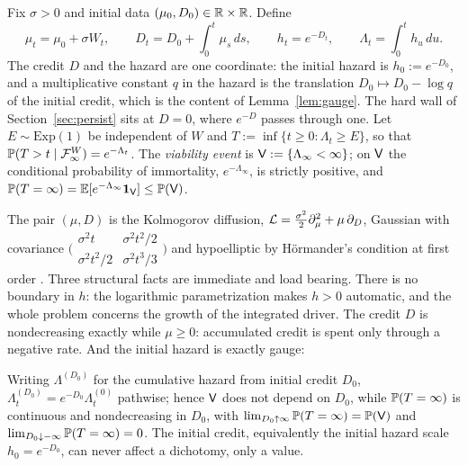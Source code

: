 \begin{definition}\label{def:model}
Fix $\sigma>0$ and initial data $(\mu_0,D_0)\in\mathbb{R}\times\mathbb{R}$. Define
\begin{equation}\label{eq:model}
\mu_t=\mu_0+\sigma W_t,\qquad
D_t=D_0+\int_0^t\mu_s\,ds,\qquad
h_t=e^{-D_t},\qquad
\Lambda_t=\int_0^t h_u\,du .
\end{equation}
The credit $D$ and the hazard are one coordinate: the initial hazard
is $h_0:=e^{-D_0}$, and a multiplicative constant $q$ in the hazard
is the translation $D_0\mapsto D_0-\log q$ of the initial credit,
which is the content of Lemma~\ref{lem:gauge}. The hard wall of
Section~\ref{sec:persist} sits at $D=0$, where $e^{-D}$ passes
through one.
Let $E\sim\mathrm{Exp}(1)$ be independent of $W$ and
$T:=\inf\{t\ge0:\Lambda_t\ge E\}$, so that
$\mathbb{P}(T>t\mid\mathcal{F}^W_\infty)=e^{-\Lambda_t}$. The \emph{viability event}
is $\mathsf{V}:=\{\Lambda_\infty<\infty\}$; on $\mathsf{V}$ the conditional
probability of immortality, $e^{-\Lambda_\infty}$, is strictly
positive, and
$\mathbb{P}(T=\infty)=\mathbb{E}[e^{-\Lambda_\infty}\mathbf{1}_{\mathsf{V}}]\le\mathbb{P}(\mathsf{V})$.
\end{definition}

The pair $(\mu,D)$ is the Kolmogorov diffusion,
$\mathcal{L}=\tfrac{\sigma^2}{2}\partial_\mu^2+\mu\,\partial_D$, Gaussian with
covariance
$\bigl(\begin{smallmatrix}\sigma^2t&\sigma^2t^2/2\\
\sigma^2t^2/2&\sigma^2t^3/3\end{smallmatrix}\bigr)$
and hypoelliptic by H\"ormander's condition at first order
\cite{Kol34,Hor67}. Three structural facts are immediate and load
bearing. There is no boundary in $h$: the logarithmic parametrization
makes $h>0$ automatic, and the whole problem concerns the growth of
the integrated driver. The credit $D$ is nondecreasing exactly while
$\mu\ge0$: accumulated credit is spent only through a negative rate.
And the initial hazard is exactly gauge:

\begin{lemma}\label{lem:gauge}
Writing $\Lambda^{(D_0)}$ for the cumulative hazard from initial
credit $D_0$, $\Lambda^{(D_0)}_t=e^{-D_0}\Lambda^{(0)}_t$ pathwise;
hence $\mathsf{V}$ does not depend on $D_0$, while $\mathbb{P}(T=\infty)$ is
continuous and nondecreasing in $D_0$, with
$\lim_{D_0\uparrow\infty}\mathbb{P}(T=\infty)=\mathbb{P}(\mathsf{V})$ and
$\lim_{D_0\downarrow-\infty}\mathbb{P}(T=\infty)=0$. The initial credit,
equivalently the initial hazard scale $h_0=e^{-D_0}$, can never affect
a dichotomy, only a value.
\end{lemma}

